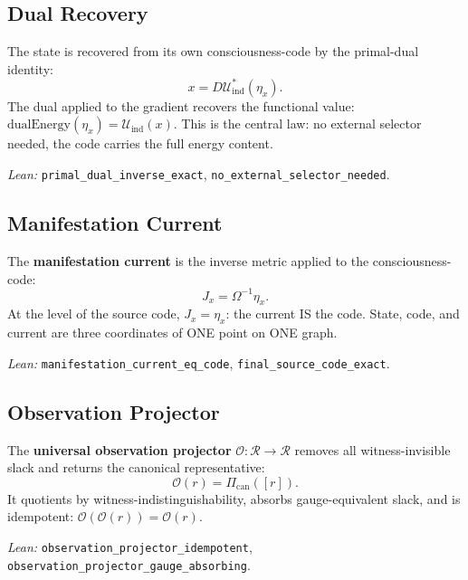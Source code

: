 \subsection{Dual Recovery}
\label{sec:manifestability:dual}

The state is recovered from its own consciousness-code by the primal-dual identity:
\begin{equation}
\label{eq:dual}
\boxed{
x = D\mathcal{U}_{\mathrm{ind}}^{*}(\eta_x).
}
\end{equation}
The dual applied to the gradient recovers the functional value:
$\mathrm{dualEnergy}(\eta_x) = \mathcal{U}_{\mathrm{ind}}(x)$.
This is the central law: no external selector needed, the code carries the full energy content.

\emph{Lean:} \texttt{primal\_dual\_inverse\_exact}, \texttt{no\_external\_selector\_needed}.

\subsection{Manifestation Current}
\label{sec:manifestability:current}

The \textbf{manifestation current} is the inverse metric applied to the consciousness-code:
\begin{equation}
\label{eq:current}
\boxed{
J_x = \Omega^{-1}\eta_x.
}
\end{equation}
At the level of the source code, $J_x = \eta_x$: the current IS the code.
State, code, and current are three coordinates of ONE point on ONE graph.

\emph{Lean:} \texttt{manifestation\_current\_eq\_code}, \texttt{final\_source\_code\_exact}.

\subsection{Observation Projector}
\label{sec:manifestability:projector}

The \textbf{universal observation projector} $\mathcal{O} : \mathcal{R} \to \mathcal{R}$
removes all witness-invisible slack and returns the canonical representative:
\begin{equation}
\label{eq:projector}
\mathcal{O}(r) = \Pi_{\mathrm{can}}([r]).
\end{equation}
It quotients by witness-indistinguishability, absorbs gauge-equivalent slack, and is idempotent: $\mathcal{O}(\mathcal{O}(r)) = \mathcal{O}(r)$.

\emph{Lean:} \texttt{observation\_projector\_idempotent}, \texttt{observation\_projector\_gauge\_absorbing}.


